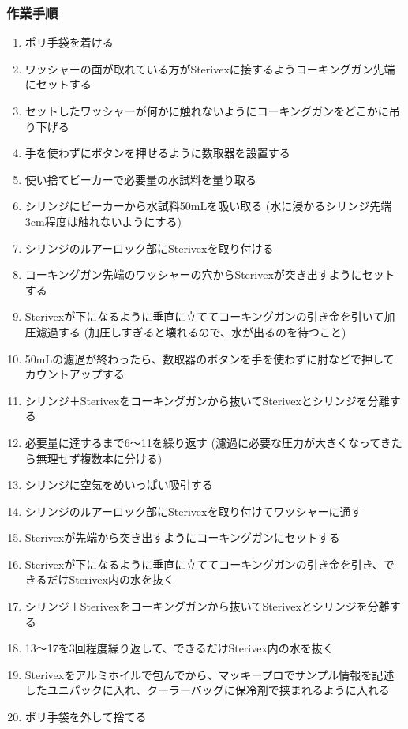 \documentclass[titlepage,10pt,a4paper,uplatex]{jsbook}
\begin{document}
\subsubsection{作業手順}
\begin{enumerate}
\item ポリ手袋を着ける
\item ワッシャーの面が取れている方がSterivexに接するようコーキングガン先端にセットする
\item セットしたワッシャーが何かに触れないようにコーキングガンをどこかに吊り下げる
\item 手を使わずにボタンを押せるように数取器を設置する
\item 使い捨てビーカーで必要量の水試料を量り取る
\item シリンジにビーカーから水試料50mLを吸い取る (水に浸かるシリンジ先端3cm程度は触れないようにする)
\item シリンジのルアーロック部にSterivexを取り付ける
\item コーキングガン先端のワッシャーの穴からSterivexが突き出すようにセットする
\item Sterivexが下になるように垂直に立ててコーキングガンの引き金を引いて加圧濾過する (加圧しすぎると壊れるので、水が出るのを待つこと)
\item 50mLの濾過が終わったら、数取器のボタンを手を使わずに肘などで押してカウントアップする
\item シリンジ＋Sterivexをコーキングガンから抜いてSterivexとシリンジを分離する
\item 必要量に達するまで6～11を繰り返す (濾過に必要な圧力が大きくなってきたら無理せず複数本に分ける)
\item シリンジに空気をめいっぱい吸引する
\item シリンジのルアーロック部にSterivexを取り付けてワッシャーに通す
\item Sterivexが先端から突き出すようにコーキングガンにセットする
\item Sterivexが下になるように垂直に立ててコーキングガンの引き金を引き、できるだけSterivex内の水を抜く
\item シリンジ＋Sterivexをコーキングガンから抜いてSterivexとシリンジを分離する
\item 13～17を3回程度繰り返して、できるだけSterivex内の水を抜く
\item Sterivexをアルミホイルで包んでから、マッキープロでサンプル情報を記述したユニパックに入れ、クーラーバッグに保冷剤で挟まれるように入れる
\item ポリ手袋を外して捨てる
\end{enumerate}
\end{document}

